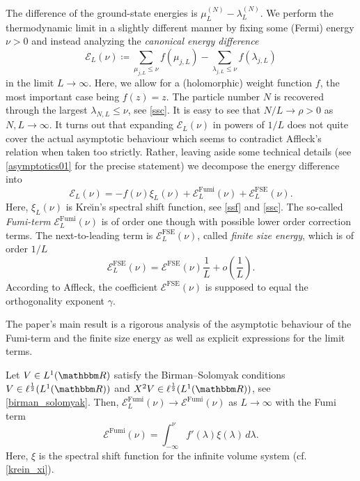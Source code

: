 The difference of the ground-state energies is $\mu^{(N)}_L- \lambda^{(N)}_L$.
We perform the thermodynamic limit in a slightly different manner by fixing some (Fermi) energy $\nu>0$
and instead analyzing the \emph{canonical energy difference}
\begin{equation}\label{intro03}
  \mathcal{E}_L(\nu) \coloneqq \sum_{\mu_{j,L}\leq\nu} f(\mu_{j,L}) - \sum_{\lambda_{j,L}\leq\nu}f(\lambda_{j,L})
\end{equation}
in the limit $L\to\infty$. Here, we allow for a (holomorphic) weight function $f$, the most important case being $f(z)=z$. 
The particle number $N$ is recovered through the largest $\lambda_{N,L}\leq \nu$, see \ref{ssc}. It is easy to see
that $N/L\to\rho>0$ as $N,L\to\infty$.
It turns out that expanding $\mathcal{E}_L(\nu)$ in powers of $1/L$ does not quite cover the actual asymptotic behaviour 
which seems to contradict Affleck's relation when taken too strictly. Rather, leaving aside some technical details
(see \eqref{asymptotics01} for the precise statement) we decompose the energy difference into
\begin{equation*}
  \mathcal{E}_L(\nu) = -f(\nu)\xi_L(\nu) + \mathcal{E}_L^{\text{Fumi}}(\nu) + \mathcal{E}_L^{\text{FSE}}(\nu) .
\end{equation*}
Here, $\xi_L(\nu)$ is Kre\u\i{}n's spectral shift function, see \ref{ssf} and \ref{ssc}.
The so-called \emph{Fumi-term} $\mathcal{E}_L^{\text{Fumi}}(\nu)$ is of order one though with possible lower order correction terms.
The next-to-leading term is $\mathcal{E}_L^{\text{FSE}}(\nu)$, called \emph{finite size energy}, which is of order $1/L$
\begin{equation*}
  \mathcal{E}_L^{\text{FSE}}(\nu) = \mathcal{E}^{\text{FSE}}(\nu)\frac{1}{L} + o(\frac{1}{L}) .
\end{equation*}
According to Affleck, the coefficient $\mathcal{E}^{\text{FSE}}(\nu)$ is supposed to equal the orthogonality exponent $\gamma$.

The paper's main result is a rigorous analysis of the asymptotic behaviour of the Fumi-term and the finite size energy 
as well as explicit expressions for the limit terms. 

\begin{theorem}\label{intro01t}
Let $V\in L^1(\R)$ satisfy the Birman--Solomyak conditions
$V\in\ell^{\frac{1}{2}}(L^1(\R))$ and $X^2V\in\ell^{\frac{1}{2}}(L^1(\R))$, see \eqref{birman_solomyak}.
Then, $\mathcal{E}_L^{\text{Fumi}}(\nu)\to\mathcal{E}^{\text{Fumi}}(\nu)$ as $L\to\infty$ with the Fumi term
\begin{equation*}
  \mathcal{E}^{\text{Fumi}}(\nu)
      = \int_{-\infty}^\nu f'(\lambda)\xi(\lambda)\, d\lambda .
\end{equation*}
Here, $\xi$ is the spectral shift function for the infinite volume system (cf. \eqref{krein_xi}).
\end{theorem}

